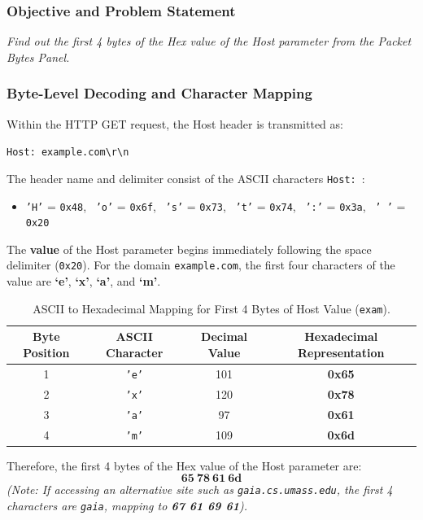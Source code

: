 \documentclass[12pt, a4paper]{article}
\begin{document}
\subsubsection{Objective and Problem Statement}
\textit{Find out the first 4 bytes of the Hex value of the Host parameter from the Packet Bytes Panel.}

\subsubsection{Byte-Level Decoding and Character Mapping}
Within the HTTP GET request, the Host header is transmitted as:
\begin{center}
    \texttt{Host: example.com\textbackslash r\textbackslash n}
\end{center}
The header name and delimiter consist of the ASCII characters \texttt{Host:\ }:
\begin{itemize}
    \item \texttt{'H'} = \texttt{0x48}, \ \texttt{'o'} = \texttt{0x6f}, \ \texttt{'s'} = \texttt{0x73}, \ \texttt{'t'} = \texttt{0x74}, \ \texttt{':'} = \texttt{0x3a}, \ \texttt{' '} = \texttt{0x20}
\end{itemize}
The \textbf{value} of the Host parameter begins immediately following the space delimiter (\texttt{0x20}). For the domain \texttt{example.com}, the first four characters of the value are \textbf{`e'}, \textbf{`x'}, \textbf{`a'}, and \textbf{`m'}.

\begin{table}[H]
\centering
\begin{tabular}{|c|c|c|c|}
\hline
\textbf{Byte Position} & \textbf{ASCII Character} & \textbf{Decimal Value} & \textbf{Hexadecimal Representation} \\ \hline
1 & \texttt{'e'} & 101 & \textbf{0x65} \\ \hline
2 & \texttt{'x'} & 120 & \textbf{0x78} \\ \hline
3 & \texttt{'a'} & 97  & \textbf{0x61} \\ \hline
4 & \texttt{'m'} & 109 & \textbf{0x6d} \\ \hline
\end{tabular}
\caption{ASCII to Hexadecimal Mapping for First 4 Bytes of Host Value (\texttt{exam}).}
\label{tab:host_hex_mapping}
\end{table}

\noindent Therefore, the first 4 bytes of the Hex value of the Host parameter are:
\begin{equation}
    \mathbf{65 \ 78 \ 61 \ 6d}
\end{equation}
\textit{(Note: If accessing an alternative site such as \texttt{gaia.cs.umass.edu}, the first 4 characters are \texttt{gaia}, mapping to \textbf{67 61 69 61}).}
\end{document}
